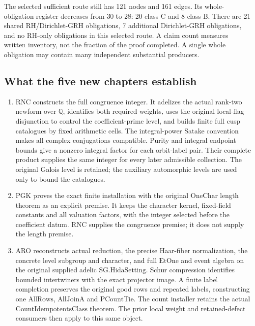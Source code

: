 \documentclass[11pt,a4paper]{article}
\numberwithin{equation}{section}
\theoremstyle{remark}\newtheorem{remark}[theorem]{Remark}
\begin{document}
The selected sufficient route still has 121 nodes and 161 edges.
Its whole-obligation register decreases from 30 to 28: 20 class C and
8 class B. There are 21 shared RH/Dirichlet-GRH obligations, 7 additional
Dirichlet-GRH obligations, and no RH-only obligations in this selected
route. A claim count measures written inventory, not the fraction of
the proof completed. A single whole obligation may contain many
independent substantial producers.

\subsection{What the five new chapters establish}

\begin{enumerate}
\item RNC constructs the full congruence integer. It adelizes the actual
rank-two newform over \(\mathbb Q\), identifies both required weights,
uses the original local-flag disjunction to control the coefficient-prime
level, and builds finite full cusp catalogues by fixed arithmetic cells.
The integral-power Satake convention makes all complex conjugations
compatible. Purity and integral endpoint bounds give a nonzero integral
factor for each orbit-label pair. Their complete product supplies the
same integer for every later admissible collection. The original
Galois level is retained; the auxiliary automorphic levels are used
only to bound the catalogues.

\item PGK proves the exact finite installation with the original
\(\mathrm{OneChar}\) length theorem as an explicit premise. It keeps
the character kernel, fixed-field constants and all valuation factors,
with the integer selected before the coefficient datum. RNC supplies
the congruence premise; it does not supply the length premise.

\item ARO reconstructs actual reduction, the precise Haar-fiber
normalization, the concrete level subgroup and character, and full
\(\mathrm{EtOne}\) and event algebra on the original supplied adelic
\(\mathrm{SG.HidaSetting}\). Schur compression identifies bounded
intertwiners with the exact projector image. A finite label completion
preserves the original good rows and repeated labels, constructing
one \(\mathrm{AllRows}\), \(\mathrm{AllJoinA}\) and
\(\mathrm{PCountTie}\). The count installer retains the actual
\(\mathrm{CountIdempotentsClass}\) theorem. The prior local weight
and retained-defect consumers then apply to this same object.


\end{enumerate}
\end{document}
